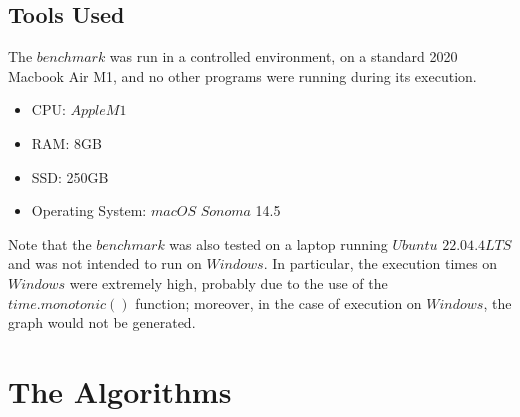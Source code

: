 \documentclass{article}
\begin{document}
\subsection{Tools Used}
The $benchmark$ was run in a controlled environment, on a standard 2020 Macbook Air M1, and no other programs were running during its execution.
\begin{itemize}
    \item CPU: $AppleM1$
    \item RAM: 8GB
    \item SSD: 250GB
    \item Operating System: $macOS$ $Sonoma$ 14.5
\end{itemize}
Note that the $benchmark$ was also tested on a laptop running $Ubuntu$ $22.04.4LTS$ and was not intended to run on $Windows$.
In particular, the execution times on $Windows$ were extremely high, probably due to the use of the $time.monotonic()$ function; moreover, in the case of execution on $Windows$, the graph would not be generated.

\section{The Algorithms}
\end{document}
